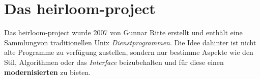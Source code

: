 \section{Das heirloom-project}
Das heirloom-project wurde 2007 von Gunnar Ritte erstellt und enthält eine Sammlungvon traditionellen Unix \textit{Dienstprogrammen}. Die Idee dahinter ist nicht alte Programme zu verfügung zustellen, sondern nur bestimme Aspekte wie den Stil, Algorithmen oder das \textit{Interface} beizubehalten und für diese einen \textbf{modernisierten } zu bieten. 
